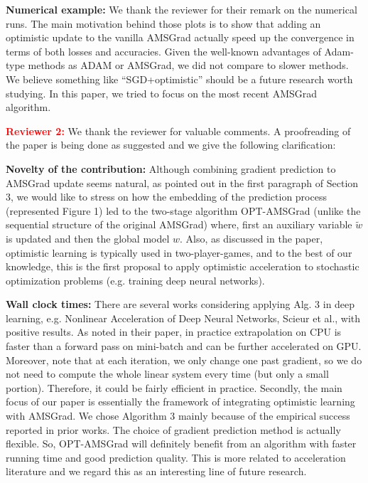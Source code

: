 \documentclass{article}
\begin{document}
\textbf{Numerical example:} We thank the reviewer for their remark on the numerical runs. 
The main motivation behind those plots is to show that adding an optimistic update to the vanilla AMSGrad actually speed up the convergence in terms of both losses and accuracies.
Given the well-known advantages of Adam-type methods as ADAM or AMSGrad, we did not compare to slower methods.
We believe something like ``SGD+optimistic'' should be a future research worth studying. In this paper, we tried to focus on the most recent AMSGrad algorithm. \vspace{-5pt}


\textbf{\textcolor{red}{Reviewer 2:}} We thank the reviewer for valuable comments. A proofreading of the paper is being done as suggested and we give the following clarification:\vspace{-5pt}

\textbf{Novelty of the contribution:} 
Although combining gradient prediction to AMSGrad update seems natural, as pointed out in the first paragraph of Section 3, we would like to stress on how the embedding of the prediction process (represented Figure 1) led to the two-stage algorithm OPT-AMSGrad (unlike the sequential structure of the original AMSGrad) where, first an auxiliary variable $\tilde{w}$ is updated and then the global model $w$. 
Also, as discussed in the paper, optimistic learning is typically used in two-player-games, and to the best of our knowledge, this is the first proposal to apply optimistic acceleration to stochastic optimization problems (e.g. training deep neural networks). \vspace{-5pt}

\textbf{Wall clock times:}
There are several works considering applying Alg. 3 in deep learning, e.g. Nonlinear Acceleration of Deep Neural Networks, Scieur et al., with positive results. As noted in their paper, in practice extrapolation on CPU is faster than a forward pass on mini-batch and can be further accelerated on GPU. Moreover, note that at each iteration, we only change one past gradient, so we do not need to compute the whole linear system every time (but only a small portion).  Therefore, it could be fairly efficient in practice. Secondly, the main focus of our paper is essentially the framework of integrating optimistic learning with AMSGrad. We chose Algorithm 3 mainly because of the empirical success reported in prior works. The choice of gradient prediction method is actually flexible. So, OPT-AMSGrad will definitely benefit from an algorithm with faster running time and good prediction quality. This is more related to acceleration literature and we regard this as an interesting line of future research.\vspace{-5pt}
\end{document}
